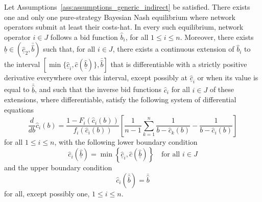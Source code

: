 \begin{propositiona}[\ref{prop:characterization_of_the_equilibrium_indirect}]
Let Assumptions~\ref{ass:assumptions_generic_indirect} be satisfied. There exists one and only one pure-strategy Bayesian Nash equilibrium where network operators submit at least their costs-hat. In every such equilibrium, network operator $i\in J$ follows a bid function $\hat{b}_i$, for all $1\leq i\leq n$. Moreover, there exists $\underline{\hat{b}}\in (\underline{\hat{c}}_2, \bar{\hat{b}})$ such that, for all $i\in J$, there exists a continuous extension of $\hat{b}_i$ to the interval $\left[\min\{\underline{\hat{c}}_i, \hat{c}(\underline{\hat{b}})\}, \bar{\hat{b}}\right]$ that is differentiable with a strictly positive derivative everywhere over this interval, except possibly at $\underline{\hat{c}}_i$ or when its value is equal to $\bar{\hat{b}}$, and such that the inverse bid functions $\hat{c}_i$ for all $i\in J$ of these extensions, where differentiable, satisfy the following system of differential equations
\begin{equation}
  \frac{d}{db}\hat{c}_i(b) = \frac{1 - F_i(\hat{c}_i(b))}{f_i(\hat{c}_i(b))}\left[ \frac{1}{n-1}\sum_{k=1}^n \frac{1}{b-\hat{c}_k(b)} - \frac{1}{b-\hat{c}_i(b)} \right]
\end{equation}
for all $1\leq i\leq n$, with the following lower boundary condition
\begin{equation}
  \hat{c}_i(\underline{\hat{b}}) = \min\left\{\underline{\hat{c}}_i, \hat{c}(\underline{\hat{b}})\right\} \quad\textrm{for all }i\in J
\end{equation}
and the upper boundary condition
\begin{equation}
  \hat{c}_i(\bar{\hat{b}}) = \bar{\hat{b}}
\end{equation}
for all, except possibly one, $1\leq i\leq n$.
\end{propositiona}
